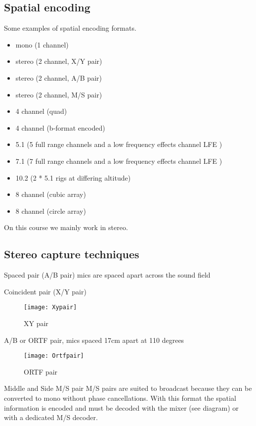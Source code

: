 \subsection{Spatial encoding}
Some examples of spatial encoding formats.
\begin{itemize}
\item mono (1 channel)
\item stereo (2 channel, X/Y pair)
\item stereo (2 channel, A/B pair)
\item stereo (2 channel, M/S pair)
\item 4 channel (quad)
\item 4 channel (b-format encoded)
\item 5.1 (5 full range channels and a low frequency effects channel LFE )
\item 7.1 (7 full range channels and a low frequency effects channel LFE )
\item 10.2 (2 * 5.1 rigs at differing altitude)
\item 8 channel (cubic array)
\item 8 channel (circle array)
\end{itemize}

On this course we mainly work in stereo.



\subsection{Stereo capture techniques}

Spaced pair (A/B pair) mics are spaced apart across the sound field

Coincident pair (X/Y pair)

\begin{figure}[H]
\centering
\texttt{[image: Xypair]}\caption{XY pair}
\label{fig:xypair}
\end{figure}

A/B or ORTF pair, mics spaced 17cm apart at 110 degrees

\begin{figure}[H]
\centering
\texttt{[image: Ortfpair]}\caption{ORTF pair}
\label{fig:ortfpair}
\end{figure}

Middle and Side M/S pair
M/S pairs are suited to broadcast because they can be converted to mono without phase cancellations. With this format the spatial information is encoded and must be decoded with the mixer (see diagram) or with a dedicated M/S decoder.

